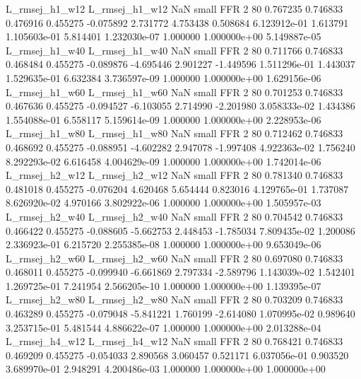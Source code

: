 L_rmsej_h1_w12 L_rmsej_h1_w12                   NaN      small      FFR                 2 80 0.767235       0.746833 0.476916       0.455275   -0.075892      2.731772      4.753438     0.508684   6.123912e-01  1.613791 1.105603e-01     5.814401   1.232030e-07            1.000000    1.000000e+00        5.149887e-05
L_rmsej_h1_w40 L_rmsej_h1_w40                   NaN      small      FFR                 2 80 0.711766       0.746833 0.468484       0.455275   -0.089876     -4.695446      2.901227    -1.449596   1.511296e-01  1.443037 1.529635e-01     6.632384   3.736597e-09            1.000000    1.000000e+00        1.629156e-06
L_rmsej_h1_w60 L_rmsej_h1_w60                   NaN      small      FFR                 2 80 0.701253       0.746833 0.467636       0.455275   -0.094527     -6.103055      2.714990    -2.201980   3.058333e-02  1.434386 1.554088e-01     6.558117   5.159614e-09            1.000000    1.000000e+00        2.228953e-06
L_rmsej_h1_w80 L_rmsej_h1_w80                   NaN      small      FFR                 2 80 0.712462       0.746833 0.468692       0.455275   -0.088951     -4.602282      2.947078    -1.997408   4.922363e-02  1.756240 8.292293e-02     6.616458   4.004629e-09            1.000000    1.000000e+00        1.742014e-06
L_rmsej_h2_w12 L_rmsej_h2_w12                   NaN      small      FFR                 2 80 0.781340       0.746833 0.481018       0.455275   -0.076204      4.620468      5.654444     0.823016   4.129765e-01  1.737087 8.626920e-02     4.970166   3.802922e-06            1.000000    1.000000e+00        1.505957e-03
L_rmsej_h2_w40 L_rmsej_h2_w40                   NaN      small      FFR                 2 80 0.704542       0.746833 0.466422       0.455275   -0.088605     -5.662753      2.448453    -1.785034   7.809435e-02  1.200086 2.336923e-01     6.215720   2.255385e-08            1.000000    1.000000e+00        9.653049e-06
L_rmsej_h2_w60 L_rmsej_h2_w60                   NaN      small      FFR                 2 80 0.697080       0.746833 0.468011       0.455275   -0.099940     -6.661869      2.797334    -2.589796   1.143039e-02  1.542401 1.269725e-01     7.241954   2.566205e-10            1.000000    1.000000e+00        1.139395e-07
L_rmsej_h2_w80 L_rmsej_h2_w80                   NaN      small      FFR                 2 80 0.703209       0.746833 0.463289       0.455275   -0.079048     -5.841221      1.760199    -2.614080   1.070995e-02  0.989640 3.253715e-01     5.481544   4.886622e-07            1.000000    1.000000e+00        2.013288e-04
L_rmsej_h4_w12 L_rmsej_h4_w12                   NaN      small      FFR                 2 80 0.768421       0.746833 0.469209       0.455275   -0.054033      2.890568      3.060457     0.521171   6.037056e-01  0.903520 3.689970e-01     2.948291   4.200486e-03            1.000000    1.000000e+00        1.000000e+00
